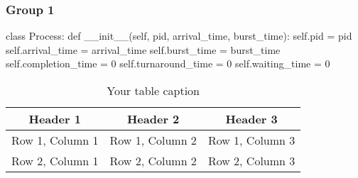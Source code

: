 \documentclass[12pt]{article}
\begin{document}
\subsubsection{Group 1}
\begin{python}
    class Process:
    def __init__(self, pid, arrival_time, burst_time):
        self.pid = pid
        self.arrival_time = arrival_time
        self.burst_time = burst_time
        self.completion_time = 0
        self.turnaround_time = 0
        self.waiting_time = 0
\end{python}

\begin{table}[htbp] %
    \centering
    \begin{tabular}{|c|c|c|} %
    \hline
    Header 1 & Header 2 & Header 3 \\ %
    \hline
    Row 1, Column 1 & Row 1, Column 2 & Row 1, Column 3 \\ %
    \hline
    Row 2, Column 1 & Row 2, Column 2 & Row 2, Column 3 \\ %
    \hline
    \end{tabular}
    \caption{Your table caption} %
    \label{tab:your_label} %
\end{table}
\end{document}
